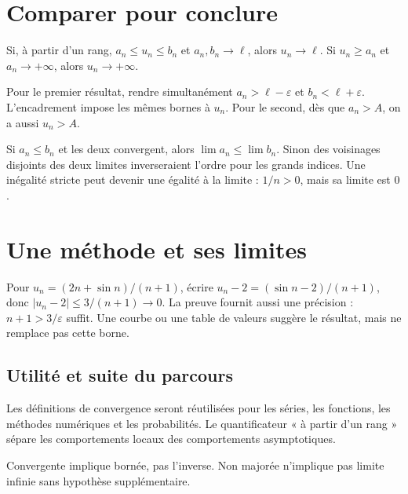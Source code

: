 \documentclass[../cours_tle.tex]{subfiles}
\begin{document}
\section{Comparer pour conclure}
\begin{theoreme}[Encadrement]
Si, à partir d'un rang, $a_n\le u_n\le b_n$ et $a_n,b_n\to\ell$, alors $u_n\to\ell$.
Si $u_n\ge a_n$ et $a_n\to+\infty$, alors $u_n\to+\infty$.
\end{theoreme}
\begin{demonstration}
Pour le premier résultat, rendre simultanément $a_n>\ell-\varepsilon$ et $b_n<\ell+\varepsilon$. L'encadrement impose les mêmes bornes à $u_n$.
Pour le second, dès que $a_n>A$, on a aussi $u_n>A$.
\end{demonstration}
Si $a_n\le b_n$ et les deux convergent, alors $\lim a_n\le\lim b_n$. Sinon des voisinages disjoints des deux limites inverseraient l'ordre pour les grands indices. Une inégalité stricte peut devenir une égalité à la limite : $1/n>0$, mais sa limite est $0$.
\section{Une méthode et ses limites}
Pour $u_n=(2n+\sin n)/(n+1)$, écrire
$u_n-2=(\sin n-2)/(n+1)$, donc $|u_n-2|\le3/(n+1)\to0$.
La preuve fournit aussi une précision : $n+1>3/\varepsilon$ suffit.
Une courbe ou une table de valeurs suggère le résultat, mais ne remplace pas cette borne.
\begin{finchapitre}
\section{Utilité et suite du parcours}
Les définitions de convergence seront réutilisées pour les séries, les fonctions, les méthodes numériques et les probabilités. Le quantificateur « à partir d'un rang » sépare les comportements locaux des comportements asymptotiques.
\begin{retenir}
Convergente implique bornée, pas l'inverse. Non majorée n'implique pas limite infinie sans hypothèse supplémentaire.
\end{retenir}
\end{finchapitre}
\end{document}
